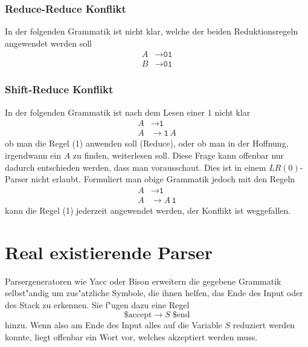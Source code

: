 \subsubsection{Reduce-Reduce Konflikt}
In der folgenden Grammatik ist nicht klar, welche der beiden Reduktionsregeln
angewendet werden soll
\begin{align*}
A&\rightarrow \texttt{01}\\
B&\rightarrow \texttt{01}
\end{align*}

\subsubsection{Shift-Reduce Konflikt}
In der folgenden Grammatik ist nach dem Lesen einer $1$ nicht klar
\begin{align*}
A&\rightarrow \texttt{1}\tag{1}\\
A&\rightarrow \texttt{1}\,A\tag{2}
\end{align*}
ob man die Regel (1) anwenden soll (Reduce), oder ob man
in der Hoffnung, irgendwann ein $A$ zu finden, weiterlesen
soll. Diese Frage kann offenbar nur dadurch entschieden werden, dass
man vorausschaut. Dies ist in einem $LR(0)$-Parser nicht erlaubt.
Formuliert man obige Grammatik jedoch mit den Regeln
\begin{align*}
A&\rightarrow \texttt{1}\tag{1}\\
A&\rightarrow A\,\texttt{1}\tag{2}
\end{align*}
kann die Regel (1) jederzeit angewendet werden, der Konflikt ist
weggefallen. 

\section{Real existierende Parser}
Parsergeneratoren wie Yacc oder Bison erweitern die gegebene Grammatik
selb\-st"andig um zus"atzliche Symbole, die ihnen helfen, das Ende
des Input oder des Stack zu erkennen. Sie f"ugen dazu eine
Regel
\[
\text{\$accept}\rightarrow S\; \text{\$end}
\]
hinzu. Wenn also am Ende des Input alles auf die Variable $S$ reduziert
werden konnte, liegt offenbar ein Wort vor, welches akzeptiert werden
muss.

